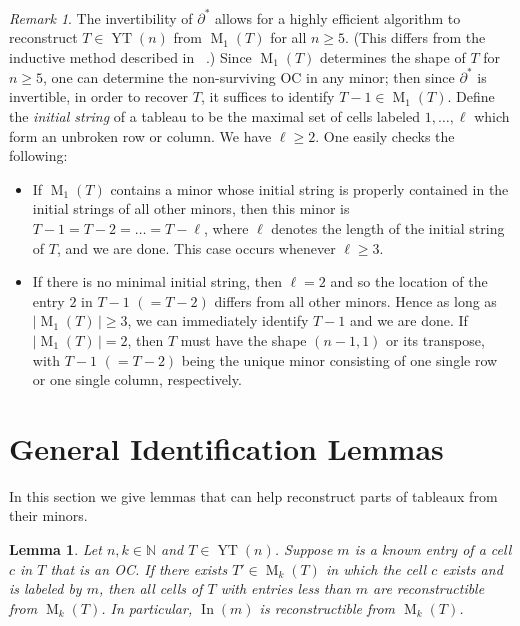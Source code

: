 \documentclass[12pt]{amsart}
\newtheorem{lemma}[theorem]{Lemma}
\theoremstyle{definition}
\theoremstyle{remark}
\newtheorem{remark}[theorem]{Remark}
\numberwithin{equation}{section}
\numberwithin{figure}{section}
\newcommand{\YT}{\operatorname{YT}}
\newcommand{\M}{\operatorname{M}}
\newcommand{\In}{\operatorname{In}}
\newcommand{\N}{\mathbb{N}}
\begin{document}
\begin{remark}
\label{rem:alternate proof M1}
The invertibility of $\partial^*$ allows for a highly efficient algorithm to reconstruct $T \in \YT(n)$ from $\M_1(T)$ for all $n \geq 5$.
(This differs from the inductive method described in ~\cite{CainLehtonen2022}.)
Since $\M_1(T)$ determines the shape of $T$ for $n \geq 5$, one can determine the non-surviving OC in any minor; then since $\partial^*$ is invertible, in order to recover $T$, it suffices to identify $T-1 \in \M_1(T)$.
Define the \emph{initial string} of a tableau to be the maximal set of cells labeled $1, \ldots, \ell$ which form an unbroken row or column. We have $\ell \ge 2$. One easily checks the following:
\begin{itemize}
\item If $\M_1(T)$ contains a minor whose initial string is properly contained in the initial strings of all other minors, then this minor is $T-1 =T-2=\ldots =T-\ell$, where $\ell$ denotes the length of the initial string of $T$, and we are done. This case occurs whenever $\ell \geq 3$.

\item If there is no minimal initial string, then $\ell = 2$ and so the location of the entry $2$ in $T-1$ $( = T-2)$ differs from all other minors.
Hence as long as $|\M_1(T)\,| \geq 3$, we can immediately identify $T-1$ and we are done.
If $|\M_1(T)\,| = 2$, then $T$ must have the shape $(n-1,1)$ or its transpose, with $T-1$ ${( = T-2)}$ being the unique minor consisting of one single row or one single column, respectively.
\end{itemize}
\end{remark}

\section{General Identification Lemmas}

In this section we give lemmas that can help reconstruct parts of tableaux from their minors.

\begin{lemma} \label{lemmma: construct In(m) when m in same place}
    Let $n,k\in\N$ and $T\in\YT(n)$. Suppose $m$ is a known entry of a cell $c$ in $T$ that is an OC. If there exists $T'\in\M_k(T)$ in which the cell $c$ exists and is labeled by $m$, then all cells of $T$ with entries less than $m$ are reconstructible from $\M_k(T)$. In particular, $\In(m)$ is reconstructible from $\M_k(T)$.
\end{lemma}
\end{document}
